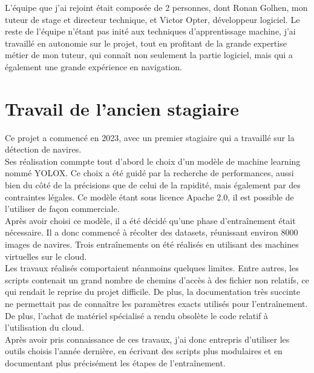 L'équipe que j'ai rejoint était composée de 2 personnes, dont Ronan Golhen, mon tuteur de stage et 
directeur technique, et Victor Opter, développeur logiciel. Le reste de l'équipe n'étant pas inité
aux techniques d'apprentissage machine, j'ai travaillé en autonomie sur le projet, 
tout en profitant de la grande expertise métier de mon tuteur, qui connaît non seulement
la partie logiciel, mais qui a également une grande expérience en navigation. \\

\section{Travail de l'ancien stagiaire}

Ce projet a commencé en 2023, avec un premier stagiaire qui a travaillé sur la détection de navires. \\

Ses réalisation commpte tout d'abord le choix d'un modèle de machine learning nommé YOLOX. 
Ce choix a été guidé par la recherche de performances, aussi bien du côté de la précisions
que de celui de la rapidité, mais également par des contraintes légales. Ce modèle étant sous 
licence Apache 2.0, il est possible de l'utiliser de façon commerciale.\\

Après avoir choisi ce modèle, il a été décidé qu'une phase d'entraînement était nécessaire. 
Il a donc commencé à récolter des datasets, réunissant environ 8000 images de navires. 
Trois entraînements on été réalisés en utilisant des machines virtuelles sur le cloud. \\ 

Les travaux réalisés comportaient néanmoins quelques limites. Entre autres, les scripts 
contenait un grand nombre de chemins d'accès à des fichier non relatifs, ce qui rendait 
le reprise du projet difficile. De plus, la documentation très succinte ne permettait pas 
de connaître les paramètres exacts utilisés pour l'entraînement. De plus, l'achat de matériel 
spécialisé a rendu obsolète le code relatif à l'utilisation du cloud.\\

Après avoir pris connaissance de ces travaux, j'ai donc entrepris d'utiliser les outils choisis
l'année dernière, en écrivant des scripts plus modulaires et en documentant plus précisément
les étapes de l'entraînement. 

